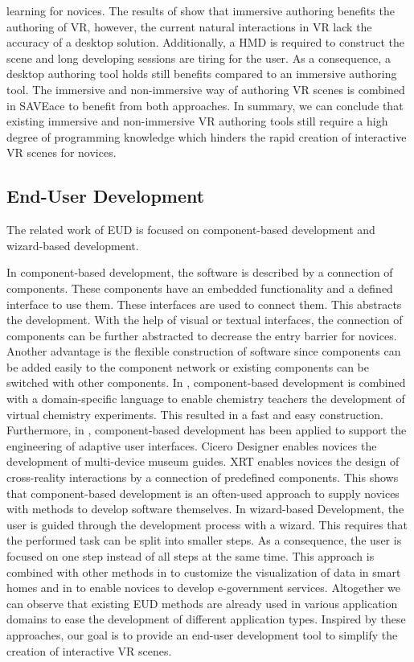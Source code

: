\documentclass[conference]{IEEEtran}
\begin{document}
learning for novices. The results of \cite{ImmersiveBenefitsGREP} show that immersive authoring benefits the authoring of \ac{VR}, however, the current natural interactions in \ac{VR} lack the accuracy of a desktop solution. Additionally, a \ac{HMD} is required to construct the scene and long developing sessions are tiring for the user. As a consequence, a desktop authoring tool holds still benefits compared to an immersive authoring tool. The immersive and non-immersive way of authoring VR scenes is combined in SAVEace \cite{immersiveDesktop} to benefit from both approaches. In summary, we can conclude that existing immersive and non-immersive VR authoring tools still require a high degree of programming knowledge which hinders the rapid creation of interactive VR scenes for novices. 

\subsection{End-User Development}
The related work of \ac{EUD} is focused on component-based development and wizard-based development. 

In component-based development, the software is described by a connection of components. These components have an embedded functionality and a defined interface to use them. These interfaces are used to connect them. This abstracts the development. With the help of visual or textual interfaces, the connection of components can be further abstracted to decrease the entry barrier for novices. Another advantage is the flexible construction of software since components can be added easily to the component network or existing components can be switched with other components. 
In \cite{componentChemie}, component-based development is combined with a domain-specific language to enable chemistry teachers the development of virtual chemistry experiments. This resulted in a fast and easy construction. Furthermore, in \cite{DBLP:conf/eics/YigitbasJJKAE19, DBLP:journals/sosym/YigitbasJBSE20, DBLP:journals/pacmhci/YigitbasHRASE19}, component-based development has been applied to support the engineering of adaptive user interfaces. Cicero Designer \cite{ComponentMuseum} enables novices the development of multi-device museum guides. XRT \cite{XRT} enables novices the design of cross-reality interactions by a connection of predefined components. This shows that component-based development is an often-used approach to supply novices with methods to develop software themselves. In wizard-based Development, the user is guided through the development process with a wizard. This requires that the performed task can be split into smaller steps. As a consequence, the user is focused on one step instead of all steps at the same time. This approach is combined with other methods in \cite{wizardSmartHome} to customize the visualization of data in smart homes and in \cite{wizardEGov} to enable novices to develop e-government services. Altogether we can observe that existing EUD methods are already used in various application domains to ease the development of different application types. Inspired by these approaches, our goal is to provide an end-user development tool to simplify the creation of interactive VR scenes.   
\end{document}
